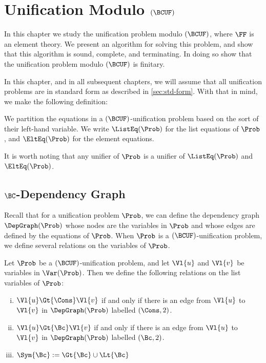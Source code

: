 \chapter{Unification Modulo $(\BCUF)$}\label{chap:unif-bcuh}

In this chapter we study the unification problem modulo $(\BCUF)$, where $\FF$
is an element theory. We present an algorithm for solving this problem, and
show that this algorithm is sound, complete, and terminating. In doing so show
that the unification problem modulo $(\BCUF)$ is finitary.

In this chapter, and in all subsequent chapters, we will assume that all
unification problems are in standard form as described in \cref{sec:std-form}.
With that in mind, we make the following definition:

\begin{Definition}
    We partition the equations in a $(\BCUF)$-unification problem based on the
    sort of their left-hand variable. We write $\ListEq(\Prob)$ for the list
    equations of $\Prob$, and $\EltEq(\Prob)$ for the element equations.
\end{Definition}

It is worth noting that any unifier of $\Prob$ is a unifier of $\ListEq(\Prob)$
and $\EltEq(\Prob)$.

\section{$\BC$-Dependency Graph}

Recall that for a unification problem $\Prob$, we can define the dependency
graph $\DepGraph(\Prob)$ whose nodes are the variables in $\Prob$ and whose
edges are defined by the equations of $\Prob$. When $\Prob$ is a
$(\BCUF)$-unification problem, we define several relations on the variables
of $\Prob$.

\begin{Definition}
    Let $\Prob$ be a $(\BCUF)$-unification problem, and let $\Vl{u}$ and
    $\Vl{v}$ be variables in $\Var(\Prob)$. Then we define the following
    relations on the list variables of $\Prob$:
    \begin{enumerate}[(i)]
        \item $\Vl{u} \Gt{\Cons} \Vl{v}$ if and only if there is an edge from
            $\Vl{u}$ to $\Vl{v}$ in $\DepGraph(\Prob)$ labelled $(\Cons, 2)$.

        \item $\Vl{u} \Gt{\Bc} \Vl{v}$ if and only if there is an edge from
            $\Vl{u}$ to $\Vl{v}$ in $\DepGraph(\Prob)$ labelled $(\Bc, 2)$.

        \item ${\Sym{\Bc}} := {\Gt{\Bc}} \cup {\Lt{\Bc}}$
    \end{enumerate}
\end{Definition}

